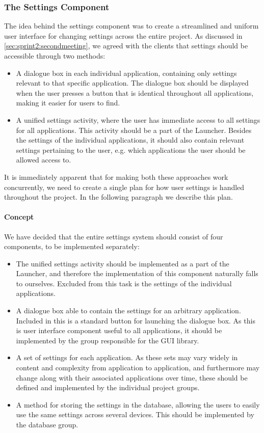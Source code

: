 \subsubsection{The Settings Component}
The idea behind the settings component was to create a streamlined and uniform user interface for changing settings across the entire \giraf project. As discussed in \cref{sec:sprint2:secondmeeting}, we agreed with the clients that settings should be accessible through two methods:
\begin{itemize}
	\item A dialogue box in each individual application, containing only settings relevant to that specific application. The dialogue box should be displayed when the user presses a button that is identical throughout all \giraf applications, making it easier for users to find.
	\item A unified settings activity, where the user has immediate access to all settings for all \giraf applications. This activity should be a part of the Launcher. Besides the settings of the individual applications, it should also contain relevant settings pertaining to the user, e.g. which applications the user should be allowed access to.
\end{itemize}

It is immediately apparent that for making both these approaches work concurrently, we need to create a single plan for how user settings is handled throughout the \giraf project. In the following paragraph we describe this plan.

\paragraph{Concept}
We have decided that the entire settings system should consist of four components, to be implemented separately:
\begin{itemize}
	\item The unified settings activity should be implemented as a part of the Launcher, and therefore the implementation of this component naturally falls to ourselves. Excluded from this task is the settings of the individual applications.
	\item A dialogue box able to contain the settings for an arbitrary \giraf application. Included in this is a standard button for launching the dialogue box. As this is user interface component useful to all applications, it should be implemented by the group responsible for the \giraf GUI library.
	\item A set of settings for each \giraf application. As these sets may vary widely in content and complexity from application to application, and furthermore may change along with their associated applications over time, these should be defined and implemented by the individual project groups. 
	\item A method for storing the settings in the database, allowing the users to easily use the same settings across several devices. This should be implemented by the database group. 
\end{itemize}

